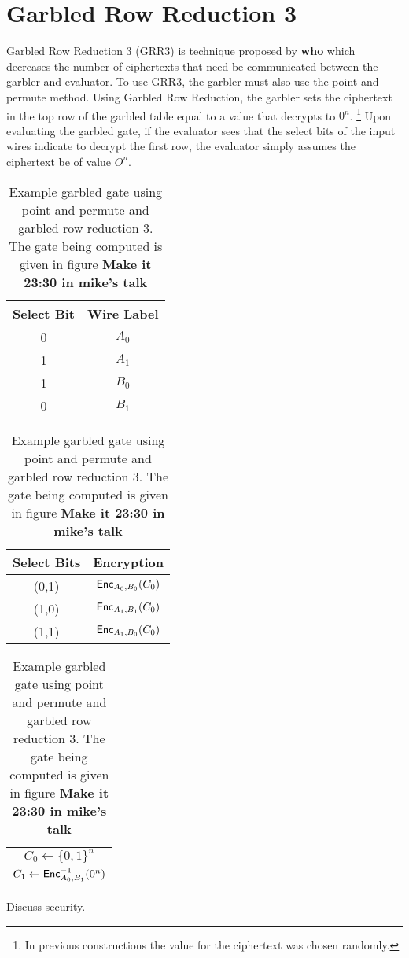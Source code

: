 \section{Garbled Row Reduction 3}
Garbled Row Reduction 3 (GRR3) is technique proposed by \textbf{who} which decreases the number of ciphertexts that need be communicated between the garbler and evaluator.
To use GRR3, the garbler must also use the point and permute method.
Using Garbled Row Reduction, the garbler sets the ciphertext in the top row of the garbled table equal to a value that decrypts to $0^n$.
\footnote{In previous constructions the value for the ciphertext was chosen randomly.}
Upon evaluating the garbled gate, if the evaluator sees that the select bits of the input wires indicate to decrypt the first row, the evaluator simply assumes the ciphertext be of value $O^n$. 

\begin{table}[h]
    \centering
    \begin{tabular}{|c|c|}
        \hline
        Select Bit & Wire Label \\
        \hline
        0 & $A_0$ \\
        1 & $A_1$ \\
        1 & $B_0$ \\
        0 & $B_1$ \\
        \hline
    \end{tabular}
    \qquad
    \begin{tabular}{|c|c|}
        \hline
        Select Bits & Encryption \\
        \hline
        (0,1) & $\textsf{Enc}_{A_0, B_0}(C_0)$ \\
        (1,0) & $\textsf{Enc}_{A_1, B_1}(C_0)$ \\
        (1,1) & $\textsf{Enc}_{A_1, B_0}(C_0)$ \\
        \hline
    \end{tabular}
    \qquad
    \begin{tabular}{|c|}
        \hline
        $C_0 \gets \{0,1\}^n$ \\
        $C_1 \gets \textsf{Enc}_{A_0, B_1}^{-1}(0^n)$ \\
        \hline
    \end{tabular}
    \caption{Example garbled gate using point and permute and garbled row reduction 3. The gate being computed is given in figure \textbf{Make it 23:30 in mike's talk}}
\end{table}

Discuss security.


